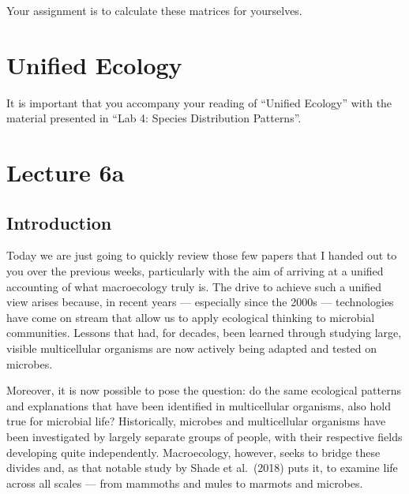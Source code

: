 \documentclass[
  10pt,
]{book}
\begin{document}
Your assignment is to calculate these matrices for yourselves.

\chapter{Unified Ecology}\label{unified-ecology}

\begin{tcolorbox}[enhanced jigsaw, colframe=quarto-callout-note-color-frame, opacityback=0, leftrule=.75mm, toprule=.15mm, rightrule=.15mm, bottomtitle=1mm, toptitle=1mm, colback=white, title=\textcolor{quarto-callout-note-color}{\faInfo}\hspace{0.5em}{Also see:}, titlerule=0mm, breakable, bottomrule=.15mm, left=2mm, arc=.35mm, coltitle=black, opacitybacktitle=0.6, colbacktitle=quarto-callout-note-color!10!white]

It is important that you accompany your reading of ``Unified Ecology''
with the material presented in ``Lab 4: Species Distribution Patterns''.

\end{tcolorbox}

\chapter*{Lecture 6a}\label{lecture-6a}

\section{Introduction}\label{introduction-2}

Today we are just going to quickly review those few papers that I handed
out to you over the previous weeks, particularly with the aim of
arriving at a unified accounting of what macroecology truly is. The
drive to achieve such a unified view arises because, in recent years ---
especially since the 2000s --- technologies have come on stream that
allow us to apply ecological thinking to microbial communities. Lessons
that had, for decades, been learned through studying large, visible
multicellular organisms are now actively being adapted and tested on
microbes.

Moreover, it is now possible to pose the question: do the same
ecological patterns and explanations that have been identified in
multicellular organisms, also hold true for microbial life?
Historically, microbes and multicellular organisms have been
investigated by largely separate groups of people, with their respective
fields developing quite independently. Macroecology, however, seeks to
bridge these divides and, as that notable study by Shade et al.~(2018)
puts it, to examine life across all scales --- from mammoths and mules
to marmots and microbes.
\end{document}
